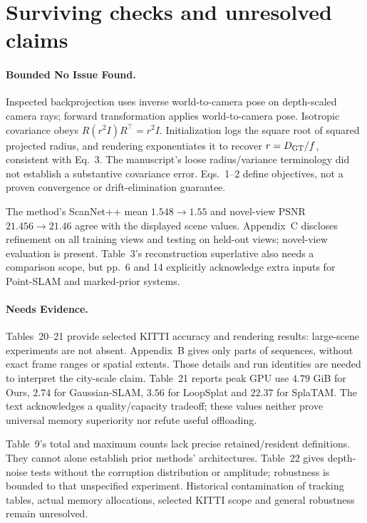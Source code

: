 \documentclass[10pt]{article}
\begin{document}
\section*{Surviving checks and unresolved claims}
\paragraph*{Bounded No Issue Found.}\mbox{}\par
Inspected backprojection uses inverse world-to-camera pose on depth-scaled camera rays; forward transformation applies world-to-camera pose. Isotropic covariance obeys \(R(r^2I)R^\top=r^2I\). Initialization logs the square root of squared projected radius, and rendering exponentiates it to recover \(r=D_{\rm GT}/f\), consistent with Eq. 3. The manuscript’s loose radius/variance terminology did not establish a substantive covariance error. Eqs. 1–2 define objectives, not a proven convergence or drift-elimination guarantee.\par
The method’s ScanNet++ mean \(1.548\to1.55\) and novel-view PSNR \(21.456\to21.46\) agree with the displayed scene values. Appendix C discloses refinement on all training views and testing on held-out views; novel-view evaluation is present. Table 3’s reconstruction superlative also needs a comparison scope, but pp. 6 and 14 explicitly acknowledge extra inputs for Point-SLAM and marked-prior systems.\par
\paragraph*{Needs Evidence.}\mbox{}\par
Tables 20–21 provide selected KITTI accuracy and rendering results: large-scene experiments are not absent. Appendix B gives only parts of sequences, without exact frame ranges or spatial extents. Those details and run identities are needed to interpret the city-scale claim. Table 21 reports peak GPU use \(4.79\) GiB for Ours, \(2.74\) for Gaussian-SLAM, \(3.56\) for LoopSplat and \(22.37\) for SplaTAM. The text acknowledges a quality/capacity tradeoff; these values neither prove universal memory superiority nor refute useful offloading.\par
Table 9’s total and maximum counts lack precise retained/resident definitions. They cannot alone establish prior methods’ architectures. Table 22 gives depth-noise tests without the corruption distribution or amplitude; robustness is bounded to that unspecified experiment. Historical contamination of tracking tables, actual memory allocations, selected KITTI scope and general robustness remain unresolved.\par
\end{document}
